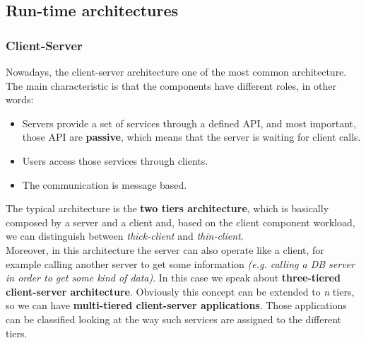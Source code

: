 \subsection{Run-time architectures}

    \subsubsection{Client-Server}
    Nowadays, the client-server architecture one of the most common architecture.\\
    The main characteristic is that the components have different roles, in other words: 
    \begin{itemize}
        \item Servers provide a set of services through a defined API, and most important, those API are \textbf{passive}, which means that the server is waiting for client calls.
        \item Users access those services through clients.
        \item The communication is message based.
    \end{itemize}
    The typical architecture is the \textbf{two tiers architecture}, which is basically
    composed by a server and a client and, based on the client component workload, we can distinguish between
    \textit{thick-client} and \textit{thin-client}.\\
    Moreover, in this architecture the server can also operate like a client, 
    for example calling another server to get some information 
    \textit{(e.g. calling a DB server in order to get some kind of data)}. 
    In this case we speak about \textbf{three-tiered client-server architecture}. 
    Obviously this concept can be extended to \textit{n} tiers, so we can have \textbf{multi-tiered client-server applications}.
    Those applications can be classified looking at the way such services are assigned to the different tiers.

